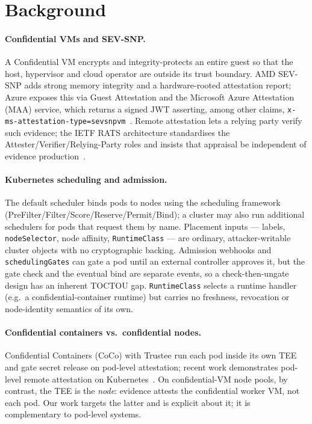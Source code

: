 \section{Background}
\label{sec:background}

\paragraph{Confidential VMs and SEV-SNP.}
A Confidential VM encrypts and integrity-protects an entire guest so that the
host, hypervisor and cloud operator are outside its trust boundary. AMD SEV-SNP
adds strong memory integrity and a hardware-rooted attestation report; Azure
exposes this via Guest Attestation and the Microsoft Azure Attestation (MAA)
service, which returns a signed JWT asserting, among other claims,
\texttt{x-ms-attestation-type=sevsnpvm}~\cite{misono2024cvms,paradzik2024sevsnp}.
Remote attestation lets a relying party verify such evidence; the IETF RATS
architecture standardises the Attester/Verifier/Relying-Party roles and insists
that appraisal be independent of evidence
production~\cite{birkholz2023rats,chen2019opera}.

\paragraph{Kubernetes scheduling and admission.}
The default scheduler binds pods to nodes using the scheduling framework
(PreFilter/Filter/Score/Reserve/Permit/Bind); a cluster may also run additional
schedulers for pods that request them by name. Placement inputs --- labels,
\texttt{nodeSelector}, node affinity, \texttt{RuntimeClass} --- are ordinary,
attacker-writable cluster objects with no cryptographic backing. Admission
webhooks and \texttt{schedulingGates} can gate a pod until an external controller
approves it, but the gate check and the eventual bind are separate events, so a
check-then-ungate design has an inherent TOCTOU gap. \texttt{RuntimeClass}
selects a runtime handler (e.g.\ a confidential-container runtime) but carries no
freshness, revocation or node-identity semantics of its own.

\paragraph{Confidential containers vs.\ confidential nodes.}
Confidential Containers (CoCo) with Trustee run each pod inside its own TEE and
gate secret release on pod-level attestation; recent work demonstrates pod-level
remote attestation on Kubernetes~\cite{yang2026dstack,coco2024,k8s2023confidential}.
On confidential-VM node pools, by contrast, the TEE is the \emph{node}: evidence
attests the confidential worker VM, not each pod. Our work targets the latter and
is explicit about it; it is complementary to pod-level systems.
